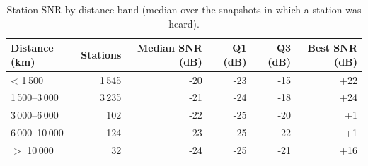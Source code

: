 \begin{table}[htbp]\centering\small
\caption{Station SNR by distance band (median over the snapshots in which a station was heard).}\label{tab:snr}
\begin{tabular}{lrrrrr}
\toprule
Distance (km) & Stations & Median SNR (dB) & Q1 (dB) & Q3 (dB) & Best SNR (dB) \\
\midrule
< 1\,500 & 1\,545 & -20 & -23 & -15 & +22 \\
1\,500--3\,000 & 3\,235 & -21 & -24 & -18 & +24 \\
3\,000--6\,000 & 102 & -22 & -25 & -20 & +1 \\
6\,000--10\,000 & 124 & -23 & -25 & -22 & +1 \\
$>$ 10\,000 & 32 & -24 & -25 & -21 & +16 \\
\bottomrule
\end{tabular}
\end{table}
